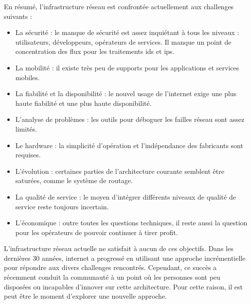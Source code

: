 En résumé, l'infrastructure réseau est confrontée actuellement aux challenges suivants :
\begin{itemize}
\item La sécurité : le manque de sécurité est assez inquiétant à tous les niveaux : utilisateurs, développeurs, opérateurs de services. Il manque un point de concentration des flux pour les traitements \gls{ids} et \gls{ips}.
\item La mobilité : il existe très peu de supports pour les applications et services mobiles.
\item La fiabilité et la disponibilité : le nouvel usage de l'internet exige une plus haute fiabilité et une plus haute disponibilité.
\item L'analyse de problèmes : les outils pour déboguer les failles réseau sont assez limités.


\item Le hardware : la simplicité d'opération et l'indépendance des fabricants sont requises.

\item L'évolution : certaines parties de l'architecture courante semblent être saturées, comme le système de routage.
\item La qualité de service : le moyen d'intégrer différents niveaux de qualité de service reste toujours incertain.
\item L'économique : outre toutes les questions techniques, il reste aussi la question pour les opérateurs de pouvoir continuer à tirer profit.
\end{itemize}
\cite{InernetCleanSlateDesignIntro}

L'infrastructure réseau actuelle ne satisfait à aucun de ces objectifs. \cite{fabricIntro}  Dans les dernières 30 années, internet a progressé en utilisant une approche incrémentielle pour répondre aux divers challenges rencontrés. Cependant, ce succès a récemment conduit la communauté à un point où les personnes sont peu disposées ou incapables d'innover sur cette architecture. Pour cette raison, il est peut être le moment d'explorer une nouvelle approche. \cite{InernetCleanSlateDesignApproach}

